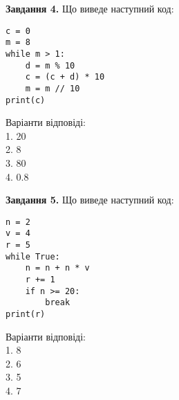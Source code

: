 \documentclass{article}
\begin{document}
\begin{multicols}{2}
\begin{tcolorbox}[rounded corners, top=1mm, bottom=1mm]
\textbf{Завдання 4.} Що виведе наступний код:
\begin{verbatim}
c = 0
m = 8
while m > 1:
    d = m % 10
    c = (c + d) * 10
    m = m // 10
print(c)
\end{verbatim}
Варіанти відповіді: \\
1. 20 \\
2. 8 \\
3. 80 \\
4. 0.8 \\
\end{tcolorbox}

\begin{tcolorbox}[rounded corners, top=1mm, bottom=1mm]
\textbf{Завдання 5.} Що виведе наступний код:
\begin{verbatim}
n = 2
v = 4
r = 5
while True:
    n = n + n * v
    r += 1
    if n >= 20:
        break
print(r)
\end{verbatim}
Варіанти відповіді: \\
1. 8 \\
2. 6 \\
3. 5 \\
4. 7 \\
\end{tcolorbox}

\end{multicols}
\end{document}

